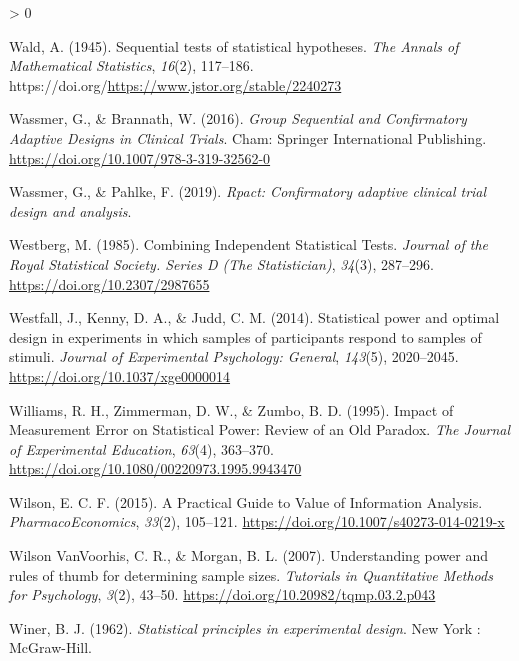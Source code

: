 \documentclass[
  english,
  ,jou,floatsintext]{apa6}
\newlength{\cslhangindent}
\newenvironment{CSLReferences}[2] %
 {%
  \setlength{\parindent}{0pt}
  \ifodd #1 \everypar{\setlength{\hangindent}{\cslhangindent}}\ignorespaces\fi
  \ifnum #2 > 0
  \setlength{\parskip}{#2\baselineskip}
  \fi
 }%
 {}
\begin{document}
\begin{CSLReferences}{1}{0}
\leavevmode\hypertarget{ref-wald_sequential_1945}{}%
Wald, A. (1945). Sequential tests of statistical hypotheses. \emph{The Annals of Mathematical Statistics}, \emph{16}(2), 117--186. https://doi.org/\url{https://www.jstor.org/stable/2240273}

\leavevmode\hypertarget{ref-wassmer_group_2016}{}%
Wassmer, G., \& Brannath, W. (2016). \emph{Group {Sequential} and {Confirmatory Adaptive Designs} in {Clinical Trials}}. {Cham}: {Springer International Publishing}. \url{https://doi.org/10.1007/978-3-319-32562-0}

\leavevmode\hypertarget{ref-wassmer_rpact_2019}{}%
Wassmer, G., \& Pahlke, F. (2019). \emph{Rpact: {Confirmatory} adaptive clinical trial design and analysis}.

\leavevmode\hypertarget{ref-westberg_combining_1985}{}%
Westberg, M. (1985). Combining {Independent Statistical Tests}. \emph{Journal of the Royal Statistical Society. Series D (The Statistician)}, \emph{34}(3), 287--296. \url{https://doi.org/10.2307/2987655}

\leavevmode\hypertarget{ref-westfall_statistical_2014}{}%
Westfall, J., Kenny, D. A., \& Judd, C. M. (2014). Statistical power and optimal design in experiments in which samples of participants respond to samples of stimuli. \emph{Journal of Experimental Psychology: General}, \emph{143}(5), 2020--2045. \url{https://doi.org/10.1037/xge0000014}

\leavevmode\hypertarget{ref-williams_impact_1995}{}%
Williams, R. H., Zimmerman, D. W., \& Zumbo, B. D. (1995). Impact of {Measurement Error} on {Statistical Power}: {Review} of an {Old Paradox}. \emph{The Journal of Experimental Education}, \emph{63}(4), 363--370. \url{https://doi.org/10.1080/00220973.1995.9943470}

\leavevmode\hypertarget{ref-wilson_practical_2015}{}%
Wilson, E. C. F. (2015). A {Practical Guide} to {Value} of {Information Analysis}. \emph{PharmacoEconomics}, \emph{33}(2), 105--121. \url{https://doi.org/10.1007/s40273-014-0219-x}

\leavevmode\hypertarget{ref-wilson_vanvoorhis_understanding_2007}{}%
Wilson VanVoorhis, C. R., \& Morgan, B. L. (2007). Understanding power and rules of thumb for determining sample sizes. \emph{Tutorials in Quantitative Methods for Psychology}, \emph{3}(2), 43--50. \url{https://doi.org/10.20982/tqmp.03.2.p043}

\leavevmode\hypertarget{ref-winer_statistical_1962}{}%
Winer, B. J. (1962). \emph{Statistical principles in experimental design}. {New York : McGraw-Hill}.


\end{CSLReferences}
\end{document}
